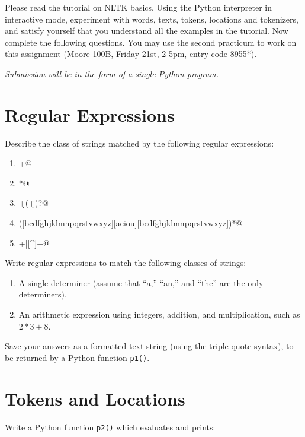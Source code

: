 \documentclass{cis530}
\begin{document}
\maketitle

Please read the tutorial on NLTK basics.
Using the Python interpreter in interactive mode, experiment
with words, texts, tokens, locations and tokenizers, and satisfy
yourself that you understand all the examples in the tutorial.
Now complete the following questions.
You may use the second practicum to work on this assignment
(Moore 100B, Friday 21st, 2-5pm, entry code 8955*).

\emph{Submission will be in the form of a single Python program.}

\section{Regular Expressions}

Describe the class of strings matched by the following regular expressions:
\begin{enumerate}
    \item \verb@[a-zA-Z]+@
    \item \verb@[A-Z][a-z]*@
    \item \verb@\d+(\.\d+)?@
    \item \verb@([bcdfghjklmnpqrstvwxyz][aeiou][bcdfghjklmnpqrstvwxyz])*@
    \item \verb@\w+|[^\w\s]+@
\end{enumerate}

Write regular expressions to match the following classes of strings:

\begin{enumerate}
    \item A single determiner (assume that ``a,'' ``an,'' and ``the''
    are the only determiners).  
    \item An arithmetic expression using integers, addition, and
    multiplication, such as $2*3+8$.
\end{enumerate}

Save your answers as a formatted text string (using the triple quote
syntax), to be returned by a Python function \texttt{p1()}.

\section{Tokens and Locations}

Write a Python function \texttt{p2()} which evaluates and prints:
\end{document}
